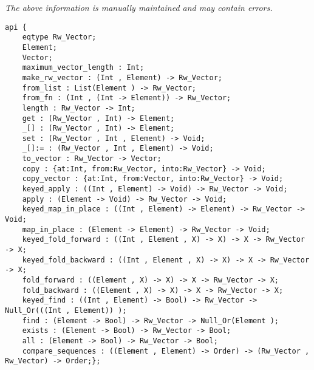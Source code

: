 \label{api:Typelocked\_Rw\_Vector}

{\tiny \it The above information is manually maintained and may contain errors.}
\begin{verbatim}
api {
    eqtype Rw_Vector;
    Element;
    Vector;
    maximum_vector_length : Int;
    make_rw_vector : (Int , Element) -> Rw_Vector;
    from_list : List(Element ) -> Rw_Vector;
    from_fn : (Int , (Int -> Element)) -> Rw_Vector;
    length : Rw_Vector -> Int;
    get : (Rw_Vector , Int) -> Element;
    _[] : (Rw_Vector , Int) -> Element;
    set : (Rw_Vector , Int , Element) -> Void;
    _[]:= : (Rw_Vector , Int , Element) -> Void;
    to_vector : Rw_Vector -> Vector;
    copy : {at:Int, from:Rw_Vector, into:Rw_Vector} -> Void;
    copy_vector : {at:Int, from:Vector, into:Rw_Vector} -> Void;
    keyed_apply : ((Int , Element) -> Void) -> Rw_Vector -> Void;
    apply : (Element -> Void) -> Rw_Vector -> Void;
    keyed_map_in_place : ((Int , Element) -> Element) -> Rw_Vector -> Void;
    map_in_place : (Element -> Element) -> Rw_Vector -> Void;
    keyed_fold_forward : ((Int , Element , X) -> X) -> X -> Rw_Vector -> X;
    keyed_fold_backward : ((Int , Element , X) -> X) -> X -> Rw_Vector -> X;
    fold_forward : ((Element , X) -> X) -> X -> Rw_Vector -> X;
    fold_backward : ((Element , X) -> X) -> X -> Rw_Vector -> X;
    keyed_find : ((Int , Element) -> Bool) -> Rw_Vector -> Null_Or(((Int , Element)) );
    find : (Element -> Bool) -> Rw_Vector -> Null_Or(Element );
    exists : (Element -> Bool) -> Rw_Vector -> Bool;
    all : (Element -> Bool) -> Rw_Vector -> Bool;
    compare_sequences : ((Element , Element) -> Order) -> (Rw_Vector , Rw_Vector) -> Order;};
\end{verbatim}
\index[fun]{\_[]:=}
\index[fun]{\_[]}
